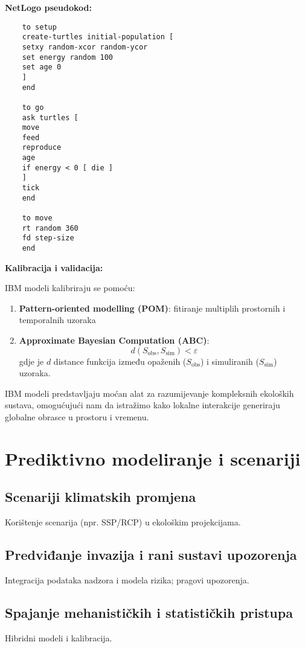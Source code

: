 \documentclass[11pt,oneside]{book}
\begin{document}
\textbf{NetLogo pseudokod:}

\begin{verbatim}
	to setup
	create-turtles initial-population [
	setxy random-xcor random-ycor
	set energy random 100
	set age 0
	]
	end
	
	to go
	ask turtles [
	move
	feed
	reproduce
	age
	if energy < 0 [ die ]
	]
	tick
	end
	
	to move
	rt random 360
	fd step-size
	end
\end{verbatim}

\textbf{Kalibracija i validacija:}

IBM modeli kalibriraju se pomoću:

\begin{enumerate}
	\item \textbf{Pattern-oriented modelling (POM)}: fitiranje multiplih prostornih i temporalnih uzoraka
	\item \textbf{Approximate Bayesian Computation (ABC)}:
	\begin{equation}
		d(S_{\text{obs}}, S_{\text{sim}}) < \varepsilon
	\end{equation}
	gdje je $d$ distance funkcija između opaženih ($S_{\text{obs}}$) i simuliranih ($S_{\text{sim}}$) uzoraka.
\end{enumerate}

IBM modeli predstavljaju moćan alat za razumijevanje kompleksnih ekoloških sustava, omogućujući nam da istražimo kako lokalne interakcije generiraju globalne obrasce u prostoru i vremenu.
	
	\chapter{Prediktivno modeliranje i scenariji}
	\section{Scenariji klimatskih promjena}
	Korištenje scenarija (npr. SSP/RCP) u ekološkim projekcijama.
	\section{Predviđanje invazija i rani sustavi upozorenja}
	Integracija podataka nadzora i modela rizika; pragovi upozorenja.
	\section{Spajanje mehanističkih i statističkih pristupa}
	Hibridni modeli i kalibracija.
	
\end{document}
